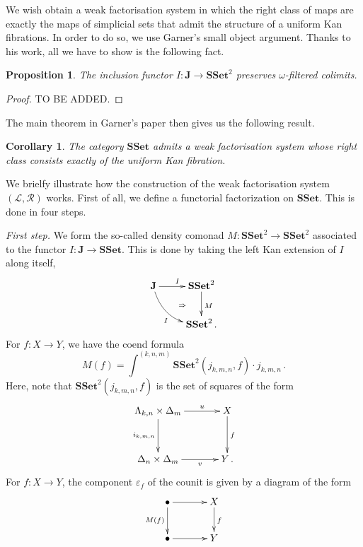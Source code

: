 \documentclass[reqno,10pt,a4paper,oneside]{amsart}
\newtheorem{proposition}[theorem]{Proposition}
\newtheorem{corollary}[theorem]{Corollary}
\theoremstyle{definition}
\newcommand{\co}{\colon}
\newcommand{\SSet}{\mathbf{SSet}}
\begin{document}
 
 
 
 We wish obtain a weak factorisation system
 in which the right class of maps are exactly the maps of simplicial sets that admit the structure of  a uniform 
 Kan fibrations. In order to do so, we use Garner's small object argument. Thanks to his work, all we have
 to show is the following fact. 
 
 \begin{proposition} The inclusion functor $I \co \mathbf{J} \to \SSet^2$ preserves $\omega$-filtered 
 colimits.
 \end{proposition} 
 
 
\begin{proof} TO BE ADDED.
\end{proof}
 
 The main theorem in Garner's paper then gives us the following result.
 
 \begin{corollary} The category $\SSet$ admits a weak factorisation system whose
 right class consists exactly of the  uniform Kan fibration. 
 \end{corollary}
 
 We brielfy illustrate how the construction of the weak factorisation system $(\mathcal{L},\mathcal{R})$
 works. First of all, we define a functorial factorization on $\SSet$. This is done in four steps. 
 
 \medskip
 
  \noindent
 {\itshape First step.} We form the so-called density comonad $M \co \SSet^2 \to \SSet^2$ 
 associated to the functor $I \co \mathbf{J} \to \SSet$.  This is done by taking the left Kan extension of $I$ along itself, 
 \[
 \xymatrix{
 \mathbf{J} \ar@/_1pc/[dr]_I \ar[r]^I  \ar@{}[dr]|{\quad \Rightarrow}  & \SSet^2 \ar[d]^{M} \\
  & \SSet^2 \, . }
  \]
 For $f \co X \to Y$, we have the coend formula
\[
M(f) = 
\int^{(k,n,m)} \SSet^2( j_{k,m,n}, f )  \cdot j_{k,m,n} \, .
\] 
Here, note that $\SSet^2( j_{k,m,n}, f )$ is  the set of squares of the form
\[
\xymatrix@C=1.2cm@R=1.2cm{
 \Lambda_{k,n} \times \Delta_m \ar[r]^-u \ar[d]_{i_{k,m,n}} & X \ar[d]^f \\
 \Delta_{n} \times \Delta_m \ar[r]_-v   &  Y \, .}
 \]
 For $f \co X \to Y$, the component $\varepsilon_f$ of the counit is given by a diagram of the form
 \[
 \xymatrix@C=1.2cm{
  \bullet \ar[r]  \ar[d]_{M(f)} & X \ar[d]^f \\
  \bullet \ar[r]  & Y }
  \]
 
 
 \medskip
 
\end{document}
